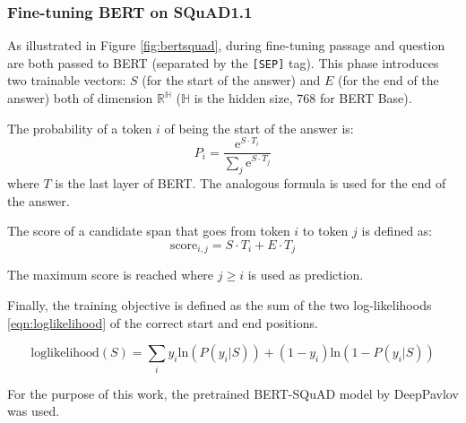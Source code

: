\subsubsection{Fine-tuning BERT on SQuAD1.1}
As illustrated in Figure \ref{fig:bertsquad}, during fine-tuning passage and question are both passed to BERT (separated by the \texttt{[SEP]} tag). This phase introduces two trainable vectors: $S$ (for the start of the answer) and $E$ (for the end of the answer) both of dimension $\mathbb{R}^\mathbb{H}$ ($\mathbb{H}$ is the hidden size, $768$ for BERT Base). 

The probability of a token $i$ of being the start of the answer is:
\begin{equation}
P_{i} = \frac{\mathrm{e}^{S \cdot T_{i}}}{\sum_{j} \mathrm{e}^{S \cdot T_{j}}}
\end{equation}
where $T$ is the last layer of BERT. The analogous formula is used for the end of the answer.

The score of a candidate span that goes from token $i$ to token $j$ is defined as:
\begin{equation}
\text{score}_{i, j} = S \cdot T_{i} + E \cdot T_{j}
\end{equation}

The maximum score is reached where $j \geq i$ is used as prediction.

Finally, the training objective is defined as the sum of the two log-likelihoods \eqref{eqn:loglikelihood} of the correct start and end positions.

\begin{equation}
\label{eqn:loglikelihood}
\text{loglikelihood}(S) = \sum_{i} y_{i} \mathrm{ln} (P(y_{i} | S)) + (1 - y_{i}) \mathrm{ln} (1 - P(y_{i} | S))
\end{equation}

For the purpose of this work, the pretrained BERT-SQuAD model by DeepPavlov \cite{deeppavlov} was used.
